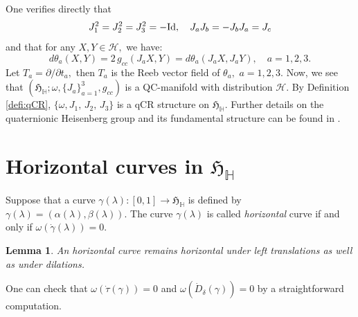 \documentclass [12pt,a4paper]{amsart}
\newcommand{\calH}{\mathcal{H}}
\newcommand{\mH}{\mathbb{H}}
\newcommand{\frakH}{\mathfrak{H}}
\theoremstyle{plain}
\newtheorem{lem}[thm]{Lemma}
\theoremstyle{definition}
\numberwithin{equation}{section}
\begin{document}
One verifies directly that
$$
J_1^2=J_2^2=J_3^2=-{\rm Id},\quad J_aJ_b=-J_bJ_a=J_c
$$
and that for any $X, Y\in\calH,$ we have:
$$d\theta_a(X, Y)=2\,g_{cc}(J_a X, Y)=d\theta_a(J_{a}X, J_{a}Y),\quad a=1,2,3.
$$
Let $T_a={\partial}/{\partial t_a},$ then $T_a$ is the Reeb vector field of $\theta_a,$ $a=1,2,3.$
Now, we see that $(\frakH_{\mH};\omega, \{J_a\}^3_{a=1}, g_{cc})$
is a QC-manifold with distribution $\calH.$ %
By Definition \ref{defi:qCR}, $\{\omega, J_1,\, J_2,\, J_3\}$ is a qCR structure on $\frakH_{\mH}$. Further details on the quaternionic Heisenberg group and its fundamental structure can be found in \cite{KP, WS}.




\section{Horizontal curves in $\frakH_\mH$} \label{sec:HC}
Suppose that a curve $\gamma (\lambda):[0, 1]\rightarrow \frakH_{\mathbb{H}}$ is defined by 
$\gamma(\lambda)=(\alpha(\lambda), \beta(\lambda)).$
The curve $\gamma(\lambda)$ is called {\it horizontal} curve if and only if  $\omega(\dot\gamma(\lambda))=0.$
\begin{lem}\label{lem:hor}
An horizontal curve remains horizontal under left translations as well as under dilations. 
\end{lem}
One can check that $\omega(\dot\tau(\gamma))=0$ and $\omega(\dot D_\delta(\gamma))=0$ by a straightforward computation.
\end{document}
